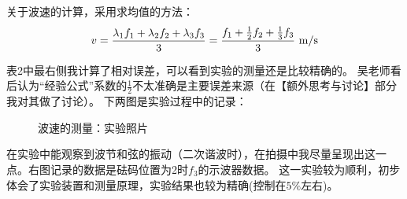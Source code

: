 \documentclass[11pt]{article}
\begin{document}
关于波速的计算，采用求均值的方法：
\[
  v=\frac{\lambda_1f_1+\lambda_2f_2+\lambda_3f_3}{3}=\frac{f_1+\frac{1}{2}f_2+\frac{1}{3}f_3}{3} \,\,{\rm m/s} 
\]

表2中最右侧我计算了相对误差，可以看到实验的测量还是比较精确的。
吴老师看后认为“经验公式”系数的$\frac{1}{2}$不太准确是主要误差来源（在【额外思考与讨论】部分我对其做了讨论）。
下两图是实验过程中的记录：


\begin{figure}[H]
    \centering
    \hspace{0.5cm}
    \caption{波速的测量：实验照片}
\end{figure}

在实验中能观察到波节和弦的振动（二次谐波时），在拍摄中我尽量呈现出这一点。右图记录的数据是砝码位置为2时$f_3$的示波器数据。
这一实验较为顺利，初步体会了实验装置和测量原理，实验结果也较为精确(控制在$5\%$左右)。
\end{document}
